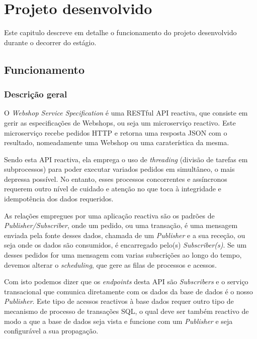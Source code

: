 \chapter{Projeto desenvolvido}\label{cap5}

Este capitulo descreve em detalhe o funcionamento do projeto desenvolvido durante o decorrer do estágio.

\section{Funcionamento}

\subsection{Descrição geral}

O \textit{Webshop Service Specification} é uma RESTful API reactiva, que consiste em gerir as especificações de Webshops, ou seja um microserviço reactivo. Este microserviço recebe pedidos HTTP e retorna uma resposta JSON com o resultado, nomeadamente uma Webshop ou uma caraterística da mesma.

Sendo esta API reactiva, ela emprega o uso de \textit{threading} (divisão de tarefas em subprocessos) para poder executar variados pedidos em simultâneo, o mais depressa possível. No entanto, esses processos concorrentes e assíncronos requerem outro nível de cuidado e atenção no que toca à integridade e idempotência dos dados requeridos.

As relações empregues por uma aplicação reactiva são os padrões de \textit{Publisher/Subscriber}, onde um pedido, ou uma transação, é uma mensagem enviada pela fonte desses dados, chamada de um \textit{Publisher} e a sua receção, ou seja onde os dados são consumidos, é encarregado pelo(s) \textit{Subscriber(s)}. Se um desses pedidos for uma mensagem com varias subscrições ao longo do tempo, devemos alterar o \textit{scheduling}, que gere as filas de processos e acessos.

Com isto podemos dizer que os \textit{endpoints} desta API são \textit{Subscribers} e o serviço transacional que comunica diretamente com os dados da base de dados é o nosso \textit{Publisher}. Este tipo de acessos reactivos à base dados requer outro tipo de mecanismo de processo de transações SQL, o qual deve ser também reactivo de modo a que a base de dados seja vista e funcione com um \textit{Publisher} e seja configurável a sua propagação.

\newpage

